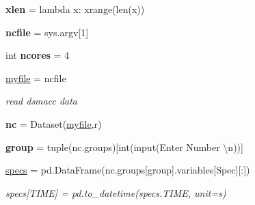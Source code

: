\begin{DoxyCompactItemize}
\item 
\mbox{\label{namespaceropa__tool_abd10613cddb56de86cbe4e4eb898d2b2}} 
{\bfseries xlen} = lambda x\+: xrange(len(x))
\item 
\mbox{\label{namespaceropa__tool_af09b0bf862ccf4fbf2ea2588f53a12ed}} 
{\bfseries ncfile} = sys.\+argv\mbox{[}1\mbox{]}
\item 
\mbox{\label{namespaceropa__tool_a685d456eb9b1fa1bd9870af53a105fa2}} 
int {\bfseries ncores} = 4
\item 
\mbox{\label{namespaceropa__tool_af477292d1e317f14120e47173d774449}} 
\mbox{\hyperlink{namespaceropa__tool_af477292d1e317f14120e47173d774449}{myfile}} = ncfile
\begin{DoxyCompactList}\small\item\em read dsmacc data \end{DoxyCompactList}\item 
\mbox{\label{namespaceropa__tool_a9a7961138879eadbd21e63aa8e02dec7}} 
{\bfseries nc} = Dataset(\mbox{\hyperlink{namespaceropa__tool_af477292d1e317f14120e47173d774449}{myfile}},\textquotesingle{}r\textquotesingle{})
\item 
\mbox{\label{namespaceropa__tool_acb6b7d554ab526bf6f104884d5f399c0}} 
{\bfseries group} = tuple(nc.\+groups)\mbox{[}int(input(\textquotesingle{}Enter Number \textbackslash{}n\textquotesingle{}))\mbox{]}
\item 
\mbox{\hyperlink{namespaceropa__tool_aa744f70435f5581e7e9d31783776f50c}{specs}} = pd.\+Data\+Frame(nc.\+groups\mbox{[}group\mbox{]}.variables\mbox{[}\textquotesingle{}Spec\textquotesingle{}\mbox{]}\mbox{[}\+:\mbox{]})
\begin{DoxyCompactList}\small\item\em specs\mbox{[}\textquotesingle{}T\+I\+ME\textquotesingle{}\mbox{]} = pd.\+to\+\_\+datetime(specs.\+T\+I\+ME, unit=\textquotesingle{}s\textquotesingle{}) \end{DoxyCompactList}\item 
\mbox{\label{namespaceropa__tool_a0279b89b5e928d90e6e4c9dd3a6160dd}} 

\end{DoxyCompactItemize}
